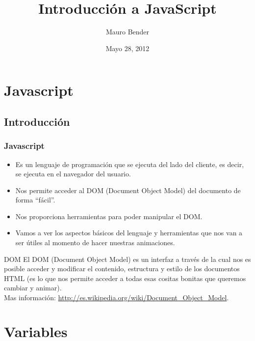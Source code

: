 \documentclass[handout, 10pt]{beamer}
\title[Javascript - JQuery (Parte 1)]{Introducción a JavaScript}
\author{Mauro Bender}
\date{Mayo 28, 2012}
\begin{document}
\begin{frame}
\titlepage
\end{frame}

\section{Javascript}
\subsection{Introducción}
\begin{frame}
  \frametitle{Javascript}


  \begin{itemize}
    \pause \item Es un lenguaje de programación que se ejecuta del lado del cliente, es decir, se ejecuta en el navegador del usuario.
    \pause \item Nos permite acceder al DOM (Document Object Model) del documento de forma ``fácil''.
    \pause \item Nos proporciona herramientas para poder manipular el DOM.
    \pause \item Vamos a ver los aspectos básicos del lenguaje y herramientas que nos van a ser útiles al momento de hacer nuestras animaciones.
  \end{itemize}
  
  \begin{block}{DOM}
	El DOM (Document Object Model) es un interfaz a través de la cual nos es posible acceder y modificar el contenido,
	estructura y estilo de los documentos HTML (es lo que nos permite acceder a todas esas cositas bonitas que queremos
	cambiar y animar). \\
	
	Mas información: \url{http://es.wikipedia.org/wiki/Document_Object_Model}.
  \end{block}

\end{frame}

\section{Variables}
\end{document}
